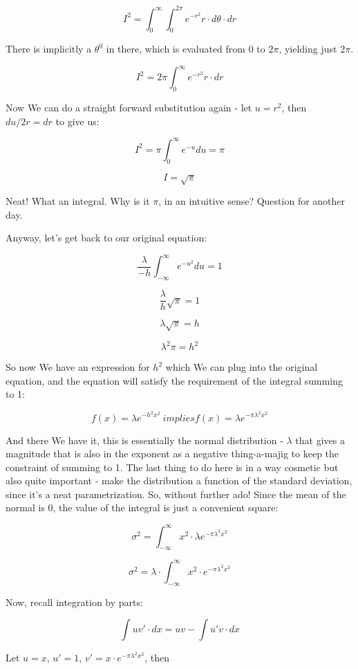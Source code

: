 \documentclass{article}
\begin{document}
		\[ I^2 = \int_{0}^{\infty}\int_{0}^{2\pi} e^{-r^2} r\cdot d\theta\cdot dr \]
				
		There is implicitly a $\theta^0$ in there, which is evaluated from $0$ to $2\pi$, yielding just $2\pi$.
		
		\[ I^2 = 2\pi\int_{0}^{\infty} e^{-r^2} r\cdot dr \]
		
		Now We can do a straight forward substitution again - let $u = r^2$, then $du/2r = dr$ to give us:
		
		\[ I^2 = \pi\int_{0}^{\infty} e^{-u} du = \pi\]
		
		\[ I = \sqrt{\pi} \]
		
		Neat! What an integral. Why is it $\pi$, in an intuitive sense? Question for another day. 
		
		Anyway, let's get back to our original equation:
		
		\[ \frac{\lambda}{-h}\int_{-\infty}^{\infty}e^{-u^2} du = 1\]
		
		\[ \frac{\lambda}{h}\sqrt{\pi} = 1\]
		
		\[ \lambda\sqrt{\pi} = h\]
		
		\[ \lambda^2\pi = h^2\]
		
		So now We have an expression for $h^2$ which We can plug into the original equation, and the equation will satisfy the requirement of the integral summing to 1:
		
		\[ f(x) = \lambda e^{-h^2x^2} \ implies f(x) = \lambda e^{-\pi\lambda^2x^2} \]
		
		And there We have it, this is essentially the normal distribution - $\lambda$ that gives a magnitude that is also in the exponent as a negative thing-a-majig to keep the constraint of summing to 1. The last thing to do here is in a way cosmetic but also quite important - make the distribution a function of the standard deviation, since it's a neat parametrization. So, without further ado! Since the mean of the normal is 0, the value of the integral is just a convenient square:
		
		\[ \sigma^2 = \int^{\infty}_{-\infty} x^2\cdot \lambda e^{-\pi\lambda^2x^2}  \]
		
		\[ \sigma^2 = \lambda\cdot\int^{\infty}_{-\infty} x^2\cdot  e^{-\pi\lambda^2x^2}  \]
		
		Now, recall integration by parts:
		
		\[ \int uv'\cdot dx = uv - \int u'v\cdot dx \]
		
		Let $u = x$, $u' = 1$, $v' = x\cdot e^{-\pi\lambda^2x^2} $, then 
		
\end{document}
